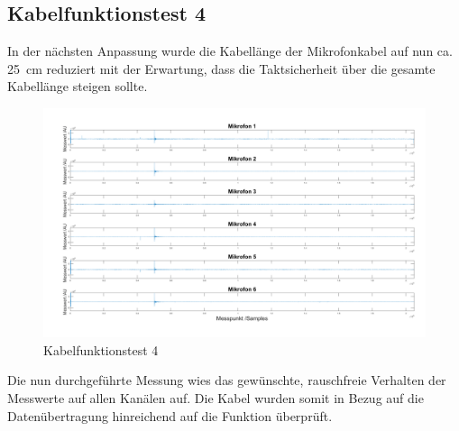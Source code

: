 \subsection{Kabelfunktionstest 4}

In der nächsten Anpassung wurde die Kabellänge der Mikrofonkabel auf nun ca. \SI{25}{cm} reduziert mit der Erwartung, dass die Taktsicherheit über die gesamte Kabellänge steigen sollte.

\begin{figure}[h]
	\begin{center}
		\includegraphics[scale=0.1]{Sections/Tests/Test_3_d}
	\end{center}
	\caption{Kabelfunktionstest 4}
	\label{fig:Test_3_d}
\end{figure}

Die nun durchgeführte Messung wies das gewünschte, rauschfreie Verhalten der Messwerte auf allen Kanälen auf. Die Kabel wurden somit in Bezug auf die Datenübertragung hinreichend auf die Funktion überprüft. 

